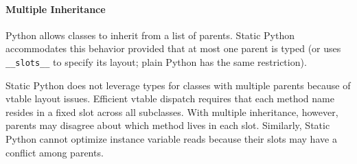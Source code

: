\documentclass[english,cleveref,submission]{programming}
\newcommand{\SP}{Static Python}
\newcommand{\code}[1]{\texttt{#1}}
\begin{document}
\paragraph{Multiple Inheritance}


Python allows classes to inherit from a list of parents.
\SP{} accommodates this behavior provided that at most one parent
is typed (or uses \code{\_\_slots\_\_} to specify its layout; plain Python has the same restriction).

\SP{} does not leverage types for classes with multiple parents
because of vtable layout issues.
Efficient vtable dispatch requires that each method name
resides in a fixed slot across all subclasses.
With multiple inheritance, however, parents may disagree about which method
lives in each slot.
Similarly, \SP{} cannot optimize instance variable reads because their slots
may have a conflict among parents.
\end{document}

